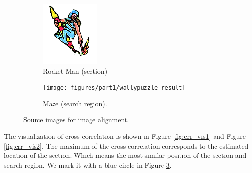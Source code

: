 \begin{figure}[h!]
	\centering
		\begin{subfigure}[t]{0.4\linewidth}
			\centering
			\includegraphics[width=0.6\linewidth]{figures/part1/wallypuzzle_rocketman.png}
			\caption{Rocket Man (section). }
			\label{fig:rocketman}
		\end{subfigure}
		\begin{subfigure}[t]{0.55\linewidth}
			\centering
			\texttt{[image: figures/part1/wallypuzzle\_result]}
			\caption{Maze (search region). }
			\label{fig:maze}
		\end{subfigure}
		\caption{Source images for image alignment.}
\end{figure} 

The visualization of cross correlation is shown in Figure \ref{fig:crr_vis1} and Figure \ref{fig:crr_vis2}. The maximum of the cross correlation corresponds to the estimated location of the section. Which means the most similar position of the section and search region. We mark it with a blue circle in Figure \ref{fig:maze}.


